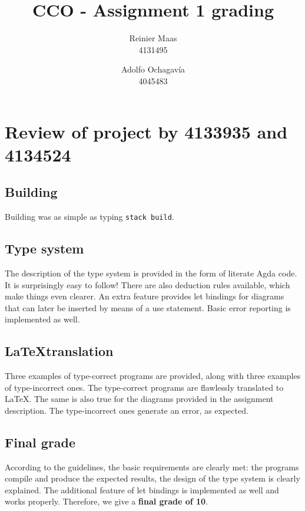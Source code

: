 \documentclass{article}
\author{
	Reinier Maas \\ 4131495
	\and
	Adolfo Ochagavía \\ 4045483
}
\title{CCO - Assignment 1 grading}
\begin{document}
	
	\maketitle
	
	
	\section{Review of project by 4133935 and 4134524}
	
	\subsection{Building}
	
	Building was as simple as typing \texttt{stack build}.
	
	\subsection{Type system}
	
	The description of the type system is provided in the form of literate Agda code. It is surprisingly easy to follow! There are also deduction rules available, which make things even clearer. An extra feature provides let bindings for diagrams that can later be inserted by means of a use statement. Basic error reporting is implemented as well.
	
	\subsection{\LaTeX translation}
	
	Three examples of type-correct programs are provided, along with three examples of type-incorrect ones. The type-correct programs are flawlessly translated to \LaTeX. The same is also true for the diagrams provided in the assignment description. The type-incorrect ones generate an error, as expected.
	
	\subsection{Final grade}
	
	According to the guidelines, the basic requirements are clearly met: the programs compile and produce the expected results, the design of the type system is clearly explained. The additional feature of let bindings is implemented as well and works properly. Therefore, we give a \textbf{final grade of 10}.
	
\end{document}

